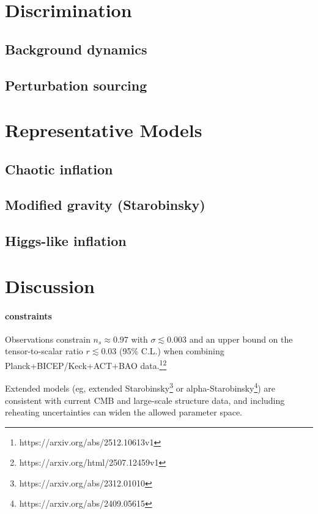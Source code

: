 \section{Discrimination}
\subsection{Background dynamics}
\subsection{Perturbation sourcing}

\section{Representative Models}

\subsection{Chaotic inflation}

\subsection{Modified gravity (Starobinsky)}



\subsection{Higgs-like inflation}


\section{Discussion}

\paragraph{constraints}
Observations constrain $n_s \approx 0.97$ with $\sigma \lesssim 0.003$ and an upper bound on the tensor-to-scalar ratio $r \lesssim 0.03$ (95\% C.L.) when combining Planck+BICEP/Keck+ACT+BAO data.\footnote{https://arxiv.org/abs/2512.10613v1}\footnote{https://arxiv.org/html/2507.12459v1}


Extended models (eg, extended Starobinsky\footnote{https://arxiv.org/abs/2312.01010} or alpha-Starobinsky\footnote{https://arxiv.org/abs/2409.05615}) are consistent with current CMB and large-scale structure data, and including reheating uncertainties can widen the allowed parameter space.





